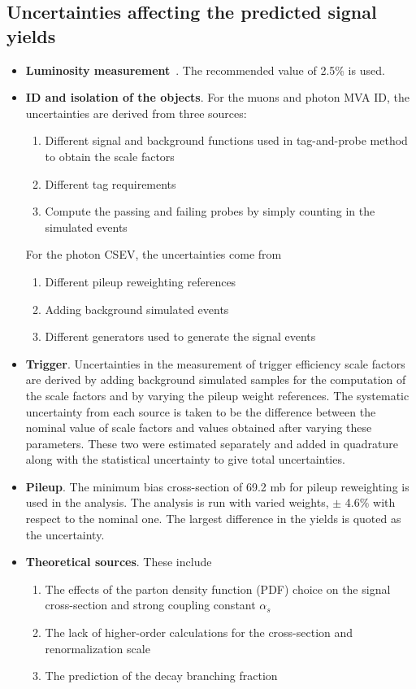 		\subsection*{Uncertainties affecting the predicted signal yields}
		\begin{itemize}
		\item \textbf{Luminosity measurement}~\cite{CMS-PAS-LUM-17-001}. The recommended value of 2.5\% is used.
		\item \textbf{ID and isolation of the objects}. For the muons and photon MVA ID, the uncertainties are derived from three sources: 
			\begin{enumerate}
		  \item Different signal and background functions used in tag-and-probe method to obtain the scale factors
		  \item Different tag requirements
		  \item Compute the passing and failing probes by simply counting in the simulated events
		  \end{enumerate}  
		  For the photon CSEV, the uncertainties come from 
		  \begin{enumerate}
		  \item Different pileup reweighting references
		  \item Adding background simulated events
		  \item Different generators used to generate the signal events
		  \end{enumerate} 
		\item \textbf{Trigger}. Uncertainties in the measurement of trigger efficiency scale factors are derived by adding background simulated samples for the computation of the scale factors and by varying the pileup weight references. The systematic uncertainty from each source is taken to be the difference between the nominal value of scale factors and values obtained after varying these parameters. These two were estimated separately and added in quadrature along with the statistical uncertainty to give total uncertainties.
		\item \textbf{Pileup}. The minimum bias cross-section of 69.2 mb for pileup reweighting is used in the analysis. The analysis is run with  varied weights, $\pm$ 4.6$\%$ with respect to the nominal one. The largest difference in the yields is quoted as the uncertainty.
		\item \textbf{Theoretical sources}. These include
		  \begin{enumerate}
		  \item The effects of the parton density function (PDF) choice on the signal cross-section and strong coupling constant $\alpha_{s}$~\cite{deFlorian:2016spz,Ball:2014uwa,Butterworth:2015oua}
		  \item The lack of higher-order calculations for the cross-section and renormalization scale~\cite{Martin2009,PhysRevD.82.074024,Alekhin:2011sk,Botje:2011sn,BALL2011296}
		  \item The prediction of the decay branching fraction~\cite{Passarino}
		  \end{enumerate}
		  
		\end{itemize}
		
